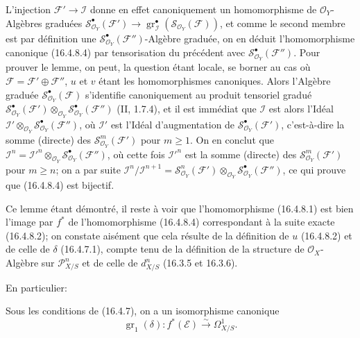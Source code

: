 L'injection $\mathscr{F}'\to\mathscr{I}$ donne en effet canoniquement un
homomorphisme de $\mathcal{O}_Y$-Algèbres graduées\linebreak
$\mathscr{S}_{\mathcal{O}_Y}^{\bullet}(\mathscr{F}')\to\allowbreak
\operatorname{gr}_{\mathscr{I}}^\bullet
(\mathscr{S}_{\mathcal{O}_Y}(\mathscr{F}))$, et comme le second membre est par
définition une $\mathscr{S}_{\mathcal{O}_Y}^{\bullet}(\mathscr{F}'')$-Algèbre
graduée, on en déduit l'homomorphisme canonique (16.4.8.4) par tensorisation du
précédent avec $\mathscr{S}_{\mathcal{O}_Y}^{\bullet}(\mathscr{F}'')$. Pour
prouver le lemme, on peut, la question étant locale, se borner au cas où
$\mathscr{F}=\mathscr{F}'\oplus\mathscr{F}''$, $u$ et $v$ étant les
homomorphismes canoniques. Alors l'Algèbre graduée
$\mathscr{S}_{\mathcal{O}_Y}^{\bullet}(\mathscr{F})$ s'identifie canoniquement au
produit tensoriel gradué
$\mathscr{S}_{\mathcal{O}_Y}^{\bullet}(\mathscr{F}')
\otimes_{\mathcal{O}_Y}
\mathscr{S}_{\mathcal{O}_Y}^{\bullet}(\mathscr{F}'')$ (II, 1.7.4), et il est
immédiat que $\mathscr{I}$ est alors l'Idéal
$\mathscr{I}'\otimes_{\mathcal{O}_Y}
\mathscr{S}_{\mathcal{O}_Y}^{\bullet}(\mathscr{F}'')$, où $\mathscr{I}'$ est
l'Idéal d'augmentation de
$\mathscr{S}_{\mathcal{O}_Y}^{\bullet}(\mathscr{F}')$, c'est-à-dire la somme
(directe) des $\mathscr{S}_{\mathcal{O}_Y}^m(\mathscr{F}')$ pour $m\geq1$. On en
conclut que $\mathscr{I}^n=\mathscr{I}'^n\otimes_{\mathcal{O}_Y}
\mathscr{S}_{\mathcal{O}_Y}^{\bullet}(\mathscr{F}'')$, où cette fois
$\mathscr{I}'^n$ est la somme (directe) des
$\mathscr{S}_{\mathcal{O}_Y}^m(\mathscr{F}')$ pour $m\geq n$; on a par suite
$\mathscr{I}^n/\mathscr{I}^{n+1}=
\mathscr{S}_{\mathcal{O}_Y}^n(\mathscr{F}')\otimes_{\mathcal{O}_Y}
\mathscr{S}_{\mathcal{O}_Y}^{\bullet}(\mathscr{F}'')$, ce qui prouve que
(16.4.8.4) est bijectif.

Ce lemme étant démontré, il reste à voir que l'homomorphisme (16.4.8.1) est
bien l'image par $f^*$ de l'homomorphisme (16.4.8.4) correspondant à la suite
exacte (16.4.8.2); on constate aisément que cela résulte de la définition de
$u$ (16.4.8.2) et de celle de $\delta$ (16.4.7.1), compte tenu de la définition
de la structure de $\mathcal{O}_X$-Algèbre sur $\mathscr{P}_{X/S}^n$ et de
celle de $d_{X/S}^n$ (16.3.5 et 16.3.6).

En particulier:

\begin{corollary}[16.4.9]
\label{IV.16.4.9}
Sous les conditions de (16.4.7), on a un isomorphisme canonique
\[
  \operatorname{gr}_1(\delta):f^*(\mathscr{E})
  \xrightarrow{\sim}\Omega_{X/S}^1.
  \tag{16.4.9.1}
  \label{IV.16.4.9.1}
\]
\end{corollary}

